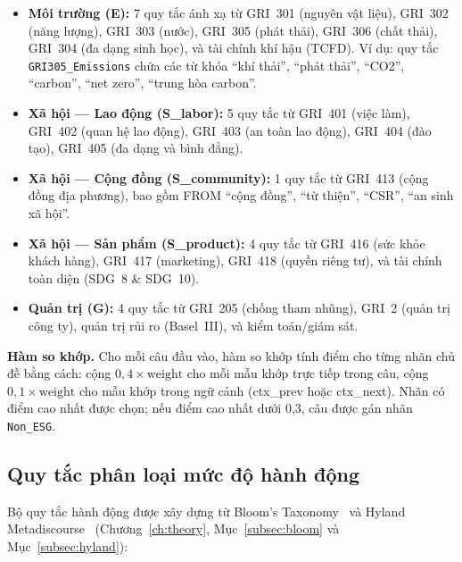 \begin{itemize}
    \item \textbf{Môi trường (E):} 7 quy tắc ánh xạ từ GRI~301 (nguyên vật liệu), GRI~302 (năng lượng), GRI~303 (nước), GRI~305 (phát thải), GRI~306 (chất thải), GRI~304 (đa dạng sinh học), và tài chính khí hậu (TCFD). Ví dụ: quy tắc \texttt{GRI305\_Emissions} chứa các từ khóa ``khí thải'', ``phát thải'', ``CO2'', ``carbon'', ``net zero'', ``trung hòa carbon''.

    \item \textbf{Xã hội --- Lao động (S\_labor):} 5 quy tắc từ GRI~401 (việc làm), GRI~402 (quan hệ lao động), GRI~403 (an toàn lao động), GRI~404 (đào tạo), GRI~405 (đa dạng và bình đẳng).

    \item \textbf{Xã hội --- Cộng đồng (S\_community):} 1 quy tắc từ GRI~413 (cộng đồng địa phương), bao gồm FROM ``cộng đồng'', ``từ thiện'', ``CSR'', ``an sinh xã hội''.

    \item \textbf{Xã hội --- Sản phẩm (S\_product):} 4 quy tắc từ GRI~416 (sức khỏe khách hàng), GRI~417 (marketing), GRI~418 (quyền riêng tư), và tài chính toàn diện (SDG~8 \& SDG~10).

    \item \textbf{Quản trị (G):} 4 quy tắc từ GRI~205 (chống tham nhũng), GRI~2 (quản trị công ty), quản trị rủi ro (Basel~III), và kiểm toán/giám sát.
\end{itemize}

\textbf{Hàm so khớp.} Cho mỗi câu đầu vào, hàm so khớp tính điểm cho từng nhãn chủ đề bằng cách: cộng $0{,}4 \times \text{weight}$ cho mỗi mẫu khớp trực tiếp trong câu, cộng $0{,}1 \times \text{weight}$ cho mẫu khớp trong ngữ cảnh (ctx\_prev hoặc ctx\_next). Nhãn có điểm cao nhất được chọn; nếu điểm cao nhất dưới 0{,}3, câu được gán nhãn \texttt{Non\_ESG}.


\subsection{Quy tắc phân loại mức độ hành động}
\label{subsec:action_rules}

Bộ quy tắc hành động được xây dựng từ Bloom's Taxonomy~\cite{anderson2001taxonomy} và Hyland Metadiscourse~\cite{rodina2007metadiscourse} (Chương~\ref{ch:theory}, Mục~\ref{subsec:bloom} và Mục~\ref{subsec:hyland}):

